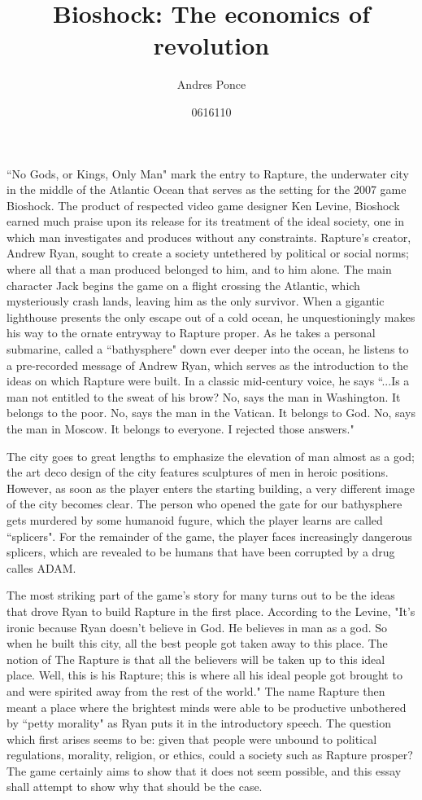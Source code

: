 \documentclass{article}
\title{Bioshock: The economics of revolution}
\author{Andres Ponce \\
\and
0616110
}
\begin{document}
\maketitle
``No Gods, or Kings, Only Man"\textcite{Bioshock} mark the entry to Rapture, the underwater city in the middle 
of the Atlantic Ocean
that serves as the setting for the 2007 game Bioshock. 
The product of respected video game designer Ken Levine, Bioshock earned much praise upon
its release for its treatment of the ideal society, one in which man investigates and produces without any 
constraints. Rapture's creator, Andrew Ryan, sought to create a society untethered by political or social 
norms; where all that a man produced belonged to him, and to him alone. The main character Jack begins the 
game on a flight crossing the Atlantic, which mysteriously crash lands, leaving him as the only survivor.
When a gigantic lighthouse presents the only escape out of a cold ocean, he unquestioningly makes his way
to the ornate entryway to Rapture proper. As he takes a personal submarine, called a ``bathysphere" down 
ever deeper into the ocean, he listens to a pre-recorded message of Andrew Ryan, which serves as the 
introduction to the ideas on which Rapture were built. In a classic mid-century voice, he says ``...Is a man
not entitled to the sweat of his brow? No, says the man in Washington. It belongs to the poor. No, says the 
man in the Vatican. It belongs to God. No, says the man in Moscow. It belongs to everyone. I rejected those
answers."\textcite{Bioshock}

The city goes to great lengths to emphasize the elevation of man almost as a god; the art deco design of the
city features sculptures of men in heroic positions. However, as soon as the player enters the starting 
building, a very different image of the city becomes clear. The person who opened the gate for our bathysphere
gets murdered by some humanoid fugure, which the player learns are called ``splicers". For the 
remainder of the game, 
the player faces increasingly dangerous splicers, which are revealed to be humans that have been corrupted by 
a drug calles ADAM.

The most striking part of the game's story for many turns out to be the ideas that drove Ryan to build Rapture
in the first place. According to the Levine, "It's ironic because Ryan doesn't believe in God. He believes 
in man as a god. So when he built this city, all the best people got taken away to this place. The notion of 
The Rapture is that all the believers will be taken up to this ideal place. Well, this is his Rapture; this is
where all his ideal people got brought to and were spirited away from the rest of the world."
\textcite{LevineInterview} The name Rapture then meant a place where the brightest minds were able to 
be productive unbothered by ``petty morality" as Ryan  puts it in the introductory speech.  The question 
which first arises seems to be: given that people were unbound to political regulations, morality, religion,
or ethics, could a society such as Rapture prosper? The game certainly aims to show that it does not seem 
possible, and this essay shall attempt to show why that should be the case. 
\end{document}
